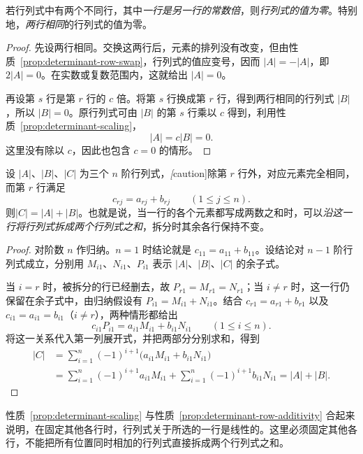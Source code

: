 \begin{property}[两行成比例]
\label{prop:determinant-proportional-rows}
若行列式中有两个不同行，其中\emph{一行是另一行的常数倍}，则\emph{行列式的值为零}。特别地，\emph{两行相同}的行列式的值为零。
\end{property}

\begin{proof}
先设两行相同。交换这两行后，元素的排列没有改变，但由性质~\ref{prop:determinant-row-swap}，行列式的值应变号，因而 $|A|=-|A|$，即 $2|A|=0$。在实数或复数范围内，这就给出 $|A|=0$。

再设第 $s$ 行是第 $r$ 行的 $c$ 倍。将第 $s$ 行换成第 $r$ 行，得到两行相同的行列式 $|B|$，所以 $|B|=0$。原行列式可由 $|B|$ 的第 $s$ 行乘以 $c$ 得到，利用性质~\ref{prop:determinant-scaling}，
\[
    |A|=c|B|=0.
\]
这里没有除以 $c$，因此也包含 $c=0$ 的情形。
\end{proof}

\begin{property}[对一行的可加性]
\label{prop:determinant-row-additivity}
设 $|A|$、$|B|$、$|C|$ 为三个 $n$ 阶行列式，\emph[caution]{除第 $r$ 行外，对应元素完全相同}，而第 $r$ 行满足
\[
    c_{rj}=a_{rj}+b_{rj}\qquad (1\leq j\leq n).
\]
则\emph{$|C|=|A|+|B|$}。也就是说，当一行的各个元素都写成两数之和时，可以\emph{沿这一行将行列式拆成两个行列式之和}，拆分时其余各行保持不变。
\end{property}

\begin{proof}
对阶数 $n$ 作归纳。$n=1$ 时结论就是 $c_{11}=a_{11}+b_{11}$。设结论对 $n-1$ 阶行列式成立，分别用 $M_{i1}$、$N_{i1}$、$P_{i1}$ 表示 $|A|$、$|B|$、$|C|$ 的余子式。

当 $i=r$ 时，被拆分的行已经删去，故 $P_{r1}=M_{r1}=N_{r1}$；当 $i\ne r$ 时，这一行仍保留在余子式中，由归纳假设有 $P_{i1}=M_{i1}+N_{i1}$。结合 $c_{r1}=a_{r1}+b_{r1}$ 以及 $c_{i1}=a_{i1}=b_{i1}$（$i\ne r$），两种情形都给出
\[
    c_{i1}P_{i1}=a_{i1}M_{i1}+b_{i1}N_{i1}
    \qquad(1\leq i\leq n).
\]
将这一关系代入第一列展开式，并把两部分分别求和，得到
\[
    \begin{aligned}
    |C|&=\sum_{i=1}^{n}(-1)^{i+1}
        \bigl(a_{i1}M_{i1}+b_{i1}N_{i1}\bigr)\\
       &=\sum_{i=1}^{n}(-1)^{i+1}a_{i1}M_{i1}
        +\sum_{i=1}^{n}(-1)^{i+1}b_{i1}N_{i1}
        =|A|+|B|.
    \end{aligned}
\]
\end{proof}

性质~\ref{prop:determinant-scaling} 与性质~\ref{prop:determinant-row-additivity} 合起来说明，在固定其他各行时，行列式关于所选的一行是线性的。这里必须固定其他各行，不能把所有位置同时相加的行列式直接拆成两个行列式之和。

